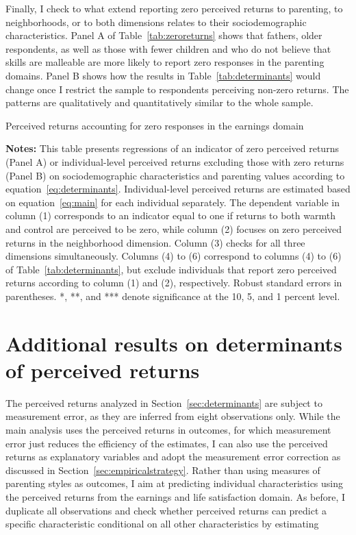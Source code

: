 \documentclass[12pt, a4paper, english]{article}
\begin{document}
Finally, I check to what extend reporting zero perceived returns to parenting, to neighborhoods, or to both dimensions relates to their sociodemographic characteristics. Panel A of Table~\ref{tab:zeroreturns} shows that fathers, older respondents, as well as those with fewer children and who do not believe that skills are malleable are more likely to report zero responses in the parenting domains. Panel B shows how the results in Table~\ref{tab:determinants} would change once I restrict the sample to respondents perceiving non-zero returns. The patterns are qualitatively and quantitatively similar to the whole sample.

\begin{table}[h!]\centering
    \caption{Perceived returns accounting for zero responses in the earnings domain}\label{tab:zeroreturns}
    \resizebox{.95\textwidth}{!}{
         
    } 
    \vspace{0.5em}
    \caption*{\footnotesize \textbf{Notes:} This table presents regressions of an indicator of zero perceived returns (Panel A) or individual-level perceived returns excluding those with zero returns (Panel B) on sociodemographic characteristics and parenting values according to equation~\ref{eq:determinants}. Individual-level perceived returns are estimated based on equation~\eqref{eq:main} for each individual separately. The dependent variable in column (1) corresponds to an indicator equal to one if returns to both warmth and control are perceived to be zero, while column (2) focuses on zero perceived returns in the neighborhood dimension. Column (3) checks for all three dimensions simultaneously. Columns (4) to (6) correspond to columns (4) to (6) of Table~\ref{tab:determinants}, but exclude individuals that report zero perceived returns according to column (1) and (2), respectively. Robust standard errors in parentheses. *, **, and *** denote significance at the 10, 5, and 1 percent level.}
\end{table}


\clearpage
\section{Additional results on determinants of perceived returns}\label{app:determinants}
\setcounter{table}{0}
\setcounter{figure}{0}
\setcounter{footnote}{0}

The perceived returns analyzed in Section~\ref{sec:determinants} are subject to measurement error, as they are inferred from eight observations only. While the main analysis uses the perceived returns in outcomes, for which measurement error just reduces the efficiency of the estimates, I can also use the perceived returns as explanatory variables and adopt the measurement error correction as discussed in Section~\ref{sec:empiricalstrategy}. Rather than using measures of parenting styles as outcomes, I aim at predicting individual characteristics using the perceived returns from the earnings and life satisfaction domain. As before, I duplicate all observations and check whether perceived returns can predict a specific characteristic conditional on all other characteristics by estimating
\end{document}
